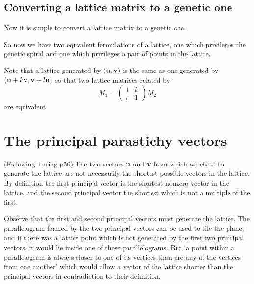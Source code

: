 \documentclass[a4paper]{article}
\newcommand{\uvec}{{\bf u}}
\newcommand{\vvec}{{\bf v}}
\begin{document}
\subsection{Converting a lattice matrix to a genetic one}
Now it is simple to convert a lattice matrix to a genetic one.



So now we have two equvalent formulations of a lattice, one which privileges the genetic spiral and one which privileges a pair of
points in the lattice.






Note that a lattice generated by $(\uvec,\vvec)$ is the same as one generated by $(\uvec+k\vvec,\vvec+l\uvec)$
so that two lattice matrices related by
\[
M_1 = \left( \begin{array}{ll} 1 & k \\ l & 1 \end{array}\right) M_2
\]
are equivalent.

\section{The principal parastichy vectors}



(Following Turing p56) The two vectors $\uvec$ and $\vvec$ from which
 we chose to generate the lattice are not necessarily the
shortest possible vectors in the lattice. By definition the first principal vector is the shortest nonzero vector in the lattice,
 and the second principal vector the shortest which is not a multiple of the first.

Observe that the first and second principal vectors must generate the lattice.
The parallelogram formed by the two principal vectors can be used to tile the plane, and
if there was a lattice point which is not generated by the first two principal vectors, it would
lie inside one of these parallelograms. But `a point within a parallelogram is always closer to one of
its vertices than are any of the vertices from one another' which would allow a vector of the lattice
shorter than the principal vectors in contradiction to their definition.
\end{document}
